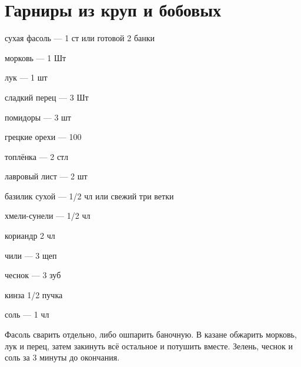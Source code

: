 \chapter*{Гарниры из круп и бобовых}
\label{sec:garnish}



{
\item сухая фасоль — 1 ст или готовой 2 банки
\item морковь — 1 Шт
\item лук — 1 шт
\item сладкий перец — 3 Шт
\item помидоры — 3 шт
\item грецкие орехи — 100 
\item топлёнка — 2 стл 
}{
\item лавровый лист — 2 шт
\item базилик сухой — 1/2 чл или свежий три ветки
\item хмели-сунели — 1/2 чл
\item кориандр 2 чл
\item чили — 3 щеп
\item чеснок — 3 зуб
\item кинза 1/2 пучка
\item соль — 1 чл
}{
Фасоль сварить отдельно, либо ошпарить баночную. В казане обжарить морковь, лук и перец, затем закинуть всё остальное и потушить вместе. Зелень, чеснок и соль за 3 минуты до окончания.
}{}{}


\recipe{}{}{}
{
\item 
}{
\item 
}{
}{}{}
